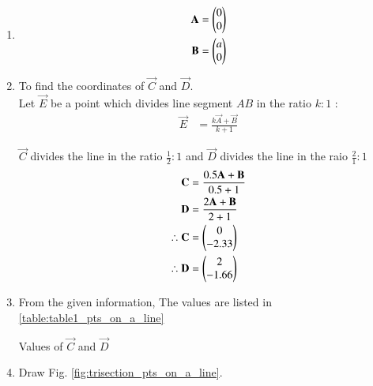 \renewcommand{\theequation}{\theenumi}
\begin{enumerate}
\item 
\begin{align}
\mathbf{A} &=\begin{pmatrix}0\\0\end{pmatrix} \label{eq:constr_a_pts_on_a_line}\\
\mathbf{B} &=\begin{pmatrix}a\\0\end{pmatrix} \label{eq:constr_b_pts_on_a_line}
\end{align}

\item To find the coordinates of $\vec{C}$ and $\vec{D}$. \\
\solution Let $\vec{E}$ be a point which divides line segment $AB$
in the ratio $k : 1$ :
\begin{align}
\vec{E} &= \frac{k\vec{A}+\vec{B}}{k+1}
\end{align}

$\vec{C}$ divides the line in the ratio $\frac{1}{2} : 1 $ and $\vec{D}$ divides the line in the raio $\frac{2}{1} : 1 $
\begin{align}
\mathbf{C} &= \frac{0.5\mathbf{A}+\mathbf{B}}{0.5+1} \\
\mathbf{D} &= \frac{2\mathbf{A}+\mathbf{B}}{2+1} \\
\therefore \mathbf{C} &= \begin{pmatrix}0\\-2.33\end{pmatrix}\\
\therefore \mathbf{D} &= \begin{pmatrix}2\\-1.66\end{pmatrix}
\end{align}


\item
From the given information, 
The values are listed in \ref{table:table1_pts_on_a_line}\\

\begin{table}[ht!]
\centering

\caption{Values of $\vec{C}$ and $\vec{D}$}
\label{table:table1_pts_on_a_line}	
\end{table} 

\item Draw Fig. \ref{fig:trisection_pts_on_a_line}.


\end{enumerate}
